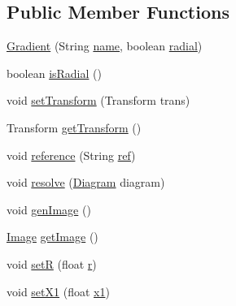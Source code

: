 \subsection*{Public Member Functions}
\begin{DoxyCompactItemize}
\item 
\mbox{\hyperlink{classorg_1_1newdawn_1_1slick_1_1svg_1_1_gradient_a23077edba4cd72aa5afb3b1b6a98b71a}{Gradient}} (String \mbox{\hyperlink{classorg_1_1newdawn_1_1slick_1_1svg_1_1_gradient_a170cbb8709185dc426c216ba621f579f}{name}}, boolean \mbox{\hyperlink{classorg_1_1newdawn_1_1slick_1_1svg_1_1_gradient_a61d950bb9ea6a93f13772e9c536241a3}{radial}})
\item 
boolean \mbox{\hyperlink{classorg_1_1newdawn_1_1slick_1_1svg_1_1_gradient_af10d51995fe2e430b01441a49b523e10}{is\+Radial}} ()
\item 
void \mbox{\hyperlink{classorg_1_1newdawn_1_1slick_1_1svg_1_1_gradient_a5b0a0622fadf0a16ddecd4068354aecf}{set\+Transform}} (Transform trans)
\item 
Transform \mbox{\hyperlink{classorg_1_1newdawn_1_1slick_1_1svg_1_1_gradient_a797b696ffa9ef0cfee7f1dd99a884f35}{get\+Transform}} ()
\item 
void \mbox{\hyperlink{classorg_1_1newdawn_1_1slick_1_1svg_1_1_gradient_ae970b165c58cd826636163d74c2d7e43}{reference}} (String \mbox{\hyperlink{classorg_1_1newdawn_1_1slick_1_1svg_1_1_gradient_af0df4455cb66dc48f4bcef9c24b3f886}{ref}})
\item 
void \mbox{\hyperlink{classorg_1_1newdawn_1_1slick_1_1svg_1_1_gradient_a1faf4be8592a1ed4af07685f36e3dc1e}{resolve}} (\mbox{\hyperlink{classorg_1_1newdawn_1_1slick_1_1svg_1_1_diagram}{Diagram}} diagram)
\item 
void \mbox{\hyperlink{classorg_1_1newdawn_1_1slick_1_1svg_1_1_gradient_ac9a99756ee5b6e6badc5a75286102880}{gen\+Image}} ()
\item 
\mbox{\hyperlink{classorg_1_1newdawn_1_1slick_1_1_image}{Image}} \mbox{\hyperlink{classorg_1_1newdawn_1_1slick_1_1svg_1_1_gradient_ad6c02617b988c9c961d4ad69ed206957}{get\+Image}} ()
\item 
void \mbox{\hyperlink{classorg_1_1newdawn_1_1slick_1_1svg_1_1_gradient_ab3472739ac84f25ac23f955065fbf41d}{setR}} (float \mbox{\hyperlink{classorg_1_1newdawn_1_1slick_1_1svg_1_1_gradient_a9eb9e743742ccbcdbcd4118d9457de24}{r}})
\item 
void \mbox{\hyperlink{classorg_1_1newdawn_1_1slick_1_1svg_1_1_gradient_a8742f8072cf0c34b9b33b5d3a069cf6d}{set\+X1}} (float \mbox{\hyperlink{classorg_1_1newdawn_1_1slick_1_1svg_1_1_gradient_a3cd592974e65659efb2ae92a73420938}{x1}})

\end{DoxyCompactItemize}
